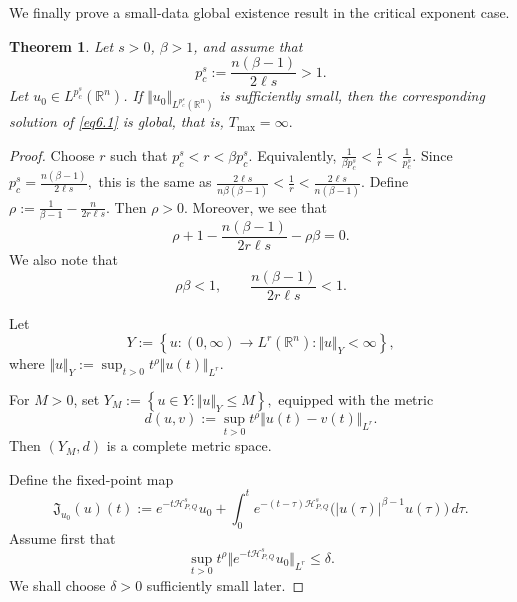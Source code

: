 \documentclass[12pt, reqno]{amsart}
\newtheorem{theorem}{Theorem}[section]
\theoremstyle{definition}
\theoremstyle{remark}
\numberwithin{equation}{section}
\newcommand{\APQ}{\mathcal{H}_{P, Q}}
\begin{document}
We finally prove a small-data global existence result in the critical exponent case.

\begin{theorem}
\label{criticalglobal}
Let $s>0$, $\beta>1$, and assume that
\[
    p_c^s:=\frac{n(\beta-1)}{2\ell s}>1.
\]
Let $u_0\in L^{p_c^s}(\mathbb R^n)$. If $\Vert u_0\Vert_{L^{p_c^s}(\mathbb R^n)}$
is sufficiently small, then the corresponding solution of \eqref{eq6.1} is global, that is, $T_{\max}=\infty.$
\end{theorem}

\begin{proof}
Choose $r$ such that $p_c^s<r<\beta p_c^s.$
Equivalently, $ \frac{1}{\beta p_c^s}
<\frac1r<
    \frac1{p_c^s}.$
Since $ p_c^s=\frac{n(\beta-1)}{2\ell s},$
this is the same as $ \frac{2\ell s}{n\beta(\beta-1)} <
    \frac{1}{r}   <
    \frac{2\ell s}{n(\beta-1)}.$
Define $\rho :=
    \frac{1}{\beta-1} -
    \frac{n}{2r\ell s}.$
Then $\rho>0$. Moreover, we see that 
\begin{equation}
\label{lessone}
    \rho +1-
    \frac{n(\beta-1)}{2r\ell s}-
    \rho\beta =0.
\end{equation}
We also note that
\[
    \rho\beta<1,
    \qquad
    \frac{n(\beta-1)}{2r\ell s}<1.
\]

Let
\[
    Y
    :=
    \left\{
    u:(0,\infty)\to L^r(\mathbb R^n):
    \Vert u\Vert_Y<\infty
    \right\},
\]
where $\Vert u\Vert_Y
    :=
    \sup_{t>0}
    t^\rho
    \Vert u(t)\Vert_{L^r}.$
    
For $M>0$, set $Y_M
    :=
    \left\{
    u\in Y:
    \Vert u\Vert_Y\leq M
    \right\},$
equipped with the metric $$d(u,v)
    :=
    \sup_{t>0}
    t^\rho
    \Vert u(t)-v(t)\Vert_{L^r}.$$
Then $(Y_M,d)$ is a complete metric space.

Define the fixed-point map
\[
    \mathfrak J_{u_0}(u)(t)
    :=
    e^{-t\APQ^s}u_0
    +
    \int_0^t
    e^{-(t-\tau)\APQ^s}
    \big(|u(\tau)|^{\beta-1}u(\tau)\big)
    \,d\tau.
\]
Assume first that
\begin{equation}
\label{6.11}
    \sup_{t>0}
    t^\rho
    \Vert e^{-t\APQ^s}u_0\Vert_{L^r}
    \leq
    \delta.
\end{equation}
We shall choose $\delta>0$ sufficiently small later.


\end{proof}
\end{document}
